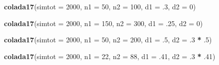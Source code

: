 \documentclass[]{book}
\newenvironment{Shaded}{\begin{snugshade}}{\end{snugshade}}
\newcommand{\CommentTok}[1]{\textcolor[rgb]{0.56,0.35,0.01}{\textit{#1}}}
\newcommand{\DataTypeTok}[1]{\textcolor[rgb]{0.13,0.29,0.53}{#1}}
\newcommand{\DecValTok}[1]{\textcolor[rgb]{0.00,0.00,0.81}{#1}}
\newcommand{\FloatTok}[1]{\textcolor[rgb]{0.00,0.00,0.81}{#1}}
\newcommand{\KeywordTok}[1]{\textcolor[rgb]{0.13,0.29,0.53}{\textbf{#1}}}
\newcommand{\NormalTok}[1]{#1}
\newcommand{\OperatorTok}[1]{\textcolor[rgb]{0.81,0.36,0.00}{\textbf{#1}}}
\newcommand{\StringTok}[1]{\textcolor[rgb]{0.31,0.60,0.02}{#1}}
\begin{document}
\begin{Shaded}
\begin{Highlighting}[]
  \KeywordTok{colada17}\NormalTok{(}\DataTypeTok{simtot =} \DecValTok{2000}\NormalTok{, }\DataTypeTok{n1 =} \DecValTok{50}\NormalTok{, }\DataTypeTok{n2 =} \DecValTok{100}\NormalTok{, }\DataTypeTok{d1 =} \FloatTok{.3}\NormalTok{, }\DataTypeTok{d2 =} \DecValTok{0}\NormalTok{)}
\end{Highlighting}
\end{Shaded}

\begin{Shaded}
\begin{Highlighting}[]
  \KeywordTok{colada17}\NormalTok{(}\DataTypeTok{simtot =} \DecValTok{2000}\NormalTok{, }\DataTypeTok{n1 =} \DecValTok{150}\NormalTok{, }\DataTypeTok{n2 =} \DecValTok{300}\NormalTok{, }\DataTypeTok{d1 =} \FloatTok{.25}\NormalTok{, }\DataTypeTok{d2 =} \DecValTok{0}\NormalTok{)}
\end{Highlighting}
\end{Shaded}

\begin{Shaded}
\end{Shaded}

\begin{Shaded}
\begin{Highlighting}[]
  \KeywordTok{colada17}\NormalTok{(}\DataTypeTok{simtot =} \DecValTok{2000}\NormalTok{, }\DataTypeTok{n1 =} \DecValTok{50}\NormalTok{, }\DataTypeTok{n2 =} \DecValTok{200}\NormalTok{, }\DataTypeTok{d1 =} \FloatTok{.5}\NormalTok{, }\DataTypeTok{d2 =} \FloatTok{.3} \OperatorTok{*}\StringTok{ }\FloatTok{.5}\NormalTok{)}
\end{Highlighting}
\end{Shaded}

\begin{Shaded}
\begin{Highlighting}[]
  \KeywordTok{colada17}\NormalTok{(}\DataTypeTok{simtot =} \DecValTok{2000}\NormalTok{, }\DataTypeTok{n1 =} \DecValTok{22}\NormalTok{, }\DataTypeTok{n2 =} \DecValTok{88}\NormalTok{, }\DataTypeTok{d1 =} \FloatTok{.41}\NormalTok{, }\DataTypeTok{d2 =} \FloatTok{.3} \OperatorTok{*}\StringTok{ }\FloatTok{.41}\NormalTok{)}
\end{Highlighting}
\end{Shaded}
\end{document}
